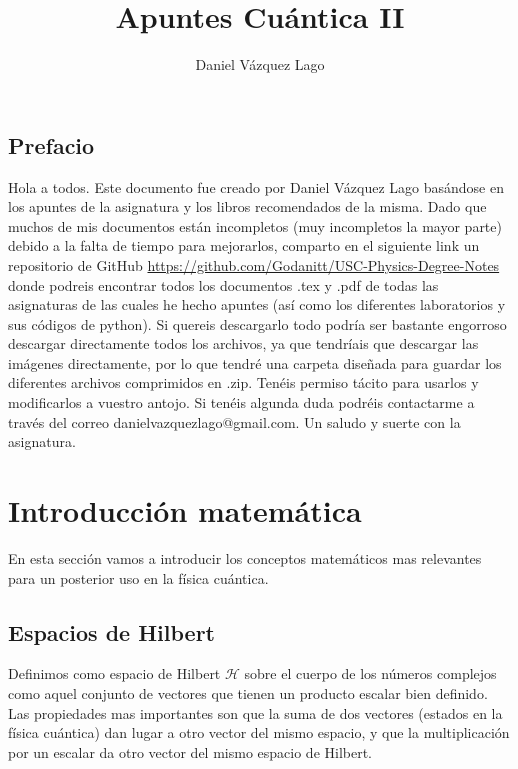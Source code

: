\documentclass[12pt]{book}
\title{Apuntes Cuántica II}
\author{Daniel Vázquez Lago}
\numberwithin{equation}{chapter}
\numberwithin{figure}{chapter}
\begin{document}
\maketitle

\newpage

\tableofcontents

\newpage

\section*{Prefacio}

Hola a todos. Este documento fue creado por Daniel Vázquez Lago basándose en los apuntes de la asignatura y los libros recomendados de la misma. Dado que muchos de mis documentos están incompletos (muy incompletos la mayor parte) debido a la falta de tiempo para mejorarlos, comparto en el siguiente link un repositorio de GitHub \url{https://github.com/Godanitt/USC-Physics-Degree-Notes} donde podreis encontrar todos los documentos .tex y .pdf de todas las asignaturas de las cuales he hecho apuntes (así como los diferentes laboratorios y sus códigos de python). Si quereis descargarlo todo podría ser bastante engorroso descargar directamente todos los archivos, ya que tendríais que descargar las imágenes directamente, por lo que tendré una carpeta diseñada para guardar los diferentes archivos comprimidos en .zip. Tenéis permiso tácito para usarlos y modificarlos a vuestro antojo. Si tenéis algunda duda podréis contactarme a través del correo danielvazquezlago@gmail.com. Un saludo y suerte con la asignatura.

\newpage

\chapter{Introducción matemática}

En esta sección vamos a introducir los conceptos matemáticos mas relevantes para un posterior uso en la física cuántica.  \\

\section{Espacios de Hilbert}

Definimos como espacio de Hilbert $\mathcal{H}$ sobre el cuerpo de los números complejos como aquel conjunto de vectores que tienen un producto escalar bien definido. Las propiedades mas importantes son que la suma de dos vectores (estados en la física cuántica) dan lugar a otro vector del mismo espacio, y que la multiplicación por un escalar da otro vector del mismo espacio de Hilbert. \\
\end{document}
